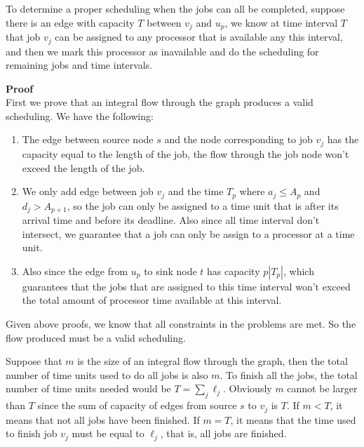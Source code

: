 \documentclass{article}
\newcommand{\Proof}{\vspace{0.3cm} \noindent\textbf{Proof} \\}
\begin{document}
To determine a proper scheduling when the
jobs can all be completed, suppose there is an edge with capacity $T$ between $v_j$ and $u_p$, 
we know at time interval $T$ that job $v_j$ can be assigned to any processor that is available
any this interval, and then we mark this processor as inavailable and do the scheduling for
remaining jobs and time intervals.    

\Proof
First we prove that an integral flow through the graph produces a valid scheduling. We have the
following:
\begin{enumerate}
  \item The edge between source node $s$ and the node corresponding to job $v_j$ has the capacity equal
    to the length of the job, the flow through the job node won't exceed the length of the job. 
  \item We only add edge between job $v_j$ and the time $T_p$ where $a_j \leq A_p$ and $d_j >
    A_{p+1}$, so the
    job can only be assigned to a time unit that is after its arrival time and before its deadline.
    Also since all time interval don't intersect, we guarantee that a job can only be assign to a
    processor at a time unit. 
  \item
  Also since the edge from $u_p$ to sink node $t$ has capacity $p|T_p|$, which guarantees that the
  jobs that are assigned to this time interval won't exceed the total amount of processor time
  available at this interval. 
\end{enumerate}
Given above proofs, we know that all constraints in the problems are met. So the flow produced
must be a valid scheduling.  

Suppose that $m$ is the size of an integral flow through the graph, then the total number of time
units used to do all jobs is also $m$. To finish all the jobs, the total number of time units needed
would be $T = \sum_{j}\ell_j$. Obviously $m$ cannot be larger than $T$ since the sum of capacity
of edges from source $s$ to $v_j$ is $T$. If $m < T$, it means that not all jobs have been finished.       
If $m = T$, it means that the time used to finish job $v_j$ must be equal to $\ell_j$, that is, all
jobs are finished.
\end{document}

